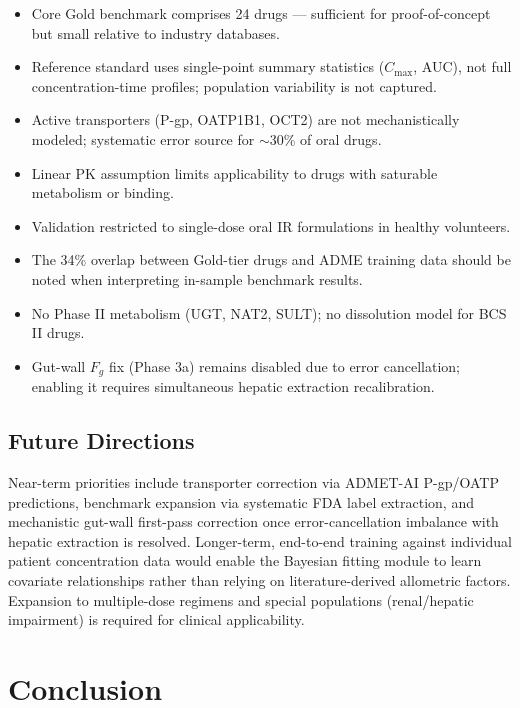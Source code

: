 \documentclass[review,3p]{elsarticle}
\begin{document}
\begin{itemize}
\item Core Gold benchmark comprises 24 drugs --- sufficient for proof-of-concept but small relative to industry databases.
\item Reference standard uses single-point summary statistics ($C_{\max}$, AUC), not full concentration-time profiles; population variability is not captured.
\item Active transporters (P-gp, OATP1B1, OCT2) are not mechanistically modeled; systematic error source for ${\sim}$30\% of oral drugs.
\item Linear PK assumption limits applicability to drugs with saturable metabolism or binding.
\item Validation restricted to single-dose oral IR formulations in healthy volunteers.
\item The 34\% overlap between Gold-tier drugs and ADME training data should be noted when interpreting in-sample benchmark results.
\item No Phase II metabolism (UGT, NAT2, SULT); no dissolution model for BCS II drugs.
\item Gut-wall $F_g$ fix (Phase 3a) remains disabled due to error cancellation; enabling it requires simultaneous hepatic extraction recalibration.
\end{itemize}

\subsection{Future Directions}
\label{sec:future}

Near-term priorities include transporter correction via ADMET-AI P-gp/OATP predictions, benchmark expansion via systematic FDA label extraction, and mechanistic gut-wall first-pass correction once error-cancellation imbalance with hepatic extraction is resolved. Longer-term, end-to-end training against individual patient concentration data would enable the Bayesian fitting module to learn covariate relationships rather than relying on literature-derived allometric factors. Expansion to multiple-dose regimens and special populations (renal/hepatic impairment) is required for clinical applicability.


\section{Conclusion}
\label{sec:conclusion}
\end{document}
